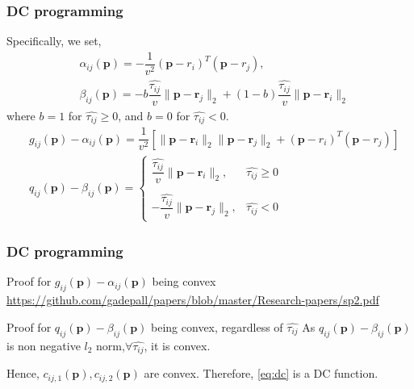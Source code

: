 \documentclass{beamer}
\providecommand{\sbrak}[1]{\ensuremath{{}\left[#1\right]}}
\begin{document}
\begin{frame}
\frametitle{DC programming}
Specifically, we set,
\begin{align}
    &\alpha_{ij}(\bm{p})=-\dfrac{1}{v^{2}}(\bm{p}-r_{i})^{T}(\bm{p}-r_{j}),\\
    &\beta_{ij}(\bm{p})=-b\dfrac{\widehat{\tau_{ij}}}{v}\|\bm{p}-\bm{r}_{j}\|_{2}+(1-b)\dfrac{\widehat{\tau_{ij}}}{v}\|\bm{p}-\bm{r}_{i}\|_{2}
\end{align}
where $b=1$ for $\widehat{\tau_{ij}}\geq 0$, and $b=0$ for $\widehat{\tau_{ij}}< 0$.
\begin{align}
\label{eq:abc}
    &g_{ij}(\bm{p})-\alpha_{ij}(\bm{p})=\dfrac{1}{v^{2}}\sbrak{\|\bm{p}-\bm{r}_{i}\|_{2}\|\bm{p}-\bm{r}_{j}\|_{2}+(\bm{p}-r_{i})^{T}(\bm{p}-r_{j})}\\
\label{eq:xyz}
    &q_{ij}(\bm{p})-\beta_{ij}(\bm{p})=\begin{cases}
    \dfrac{\widehat{\tau_{ij}}}{v}\|\bm{p}-\bm{r}_{i}\|_{2}, & \widehat{\tau_{ij}}\geq 0 \\~\\[-1em]
	-\dfrac{\widehat{\tau_{ij}}}{v}\|\bm{p}-\bm{r}_{j}\|_{2}, & \widehat{\tau_{ij}}<0
    \end{cases}
\end{align}
\end{frame}

\begin{frame}
\frametitle{DC programming}
\begin{block}{Proof for $g_{ij}(\bm{p})-\alpha_{ij}(\bm{p})$ being convex}
\url{https://github.com/gadepall/papers/blob/master/Research-papers/sp2.pdf}
\end{block}
\begin{block}{Proof for $q_{ij}(\bm{p})-\beta_{ij}(\bm{p})$ being convex, regardless of $\widehat{\tau_{ij}}$}
As $q_{ij}(\bm{p})-\beta_{ij}(\bm{p})$ is non negative $l_{2}$ norm,$\forall \widehat{\tau_{ij}}$, it is convex.
\end{block}
Hence, $c_{ij,1}(\bm{p}),c_{ij,2}(\bm{p})$ are convex. Therefore, \eqref{eq:dc} is a DC function.
\end{frame}
\end{document}
